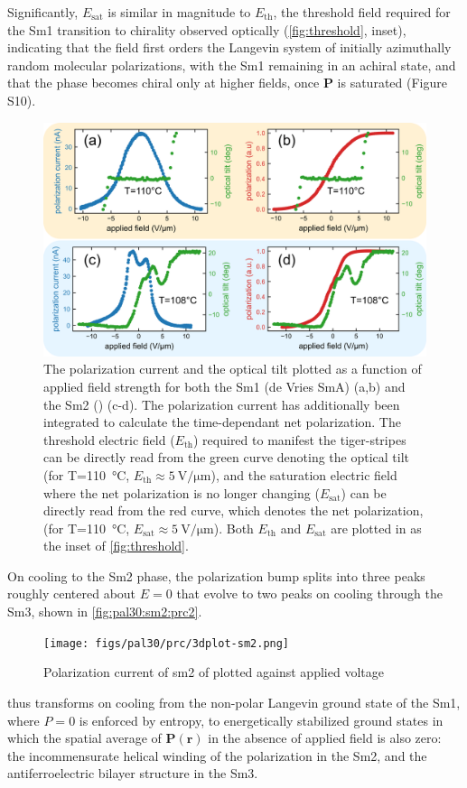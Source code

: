\documentclass[aagreenthesis]{subfiles}
\begin{document}
Significantly, $E_\text{sat}$ is similar in magnitude to $E_\text{th}$, the threshold
field required for the Sm1
transition to chirality observed optically (\autoref{fig:threshold}, inset), indicating that the
field first orders the Langevin system of initially azimuthally random molecular
polarizations, with the Sm1 remaining in an achiral state, and that the phase becomes
chiral only at higher fields, once $\mathbf{P}$ is saturated (Figure S10). 

\begin{figure}[h!]
    \centering
    \includegraphics[width=.6\textwidth]{figs/pal30/prc/PRCvsTilt/PRCVtilt.png}
    \caption{\label{fig:pal30:prcvtilt} The polarization current and the optical
    tilt plotted as a function of applied field strength for both the Sm1
(de Vries SmA) (a,b) and the Sm2 (\smcpalpha{}) (c-d). The polarization current
has additionally been integrated to calculate the time-dependant net
polarization. The threshold electric field ($E_\textrm{th}$) required to manifest the tiger-stripes can
be directly read from the green curve denoting the optical tilt (for
T=\SI{110}{\degreeCelsius}, $E_\textrm{th} \approx \SI{5}{\volt\per\micro\metre}$),
and the saturation electric field where the net polarization is no longer
changing ($E_\textrm{sat}$) can be directly
read from the red curve, which denotes the net polarization, (for
T=\SI{110}{\degreeCelsius}, $E_\textrm{sat} \approx \SI{5}{\volt\per\micro\metre}$).
Both $E_\textrm{th}$ and $E_\textrm{sat}$ are plotted in as the inset of
\autoref{fig:threshold}. }
\end{figure}


On cooling to the Sm2 phase, the polarization bump splits into three peaks roughly centered about
$E=0$ that evolve to two peaks on cooling through the Sm3, shown in
\autoref{fig:pal30:sm2:prc2}.


\begin{figure}[h!]
    \centering
    \texttt{[image: figs/pal30/prc/3dplot-sm2.png]}
    \caption{\label{fig:pal30:sm2:prc2} Polarization current of sm2 of \nfour{}
    plotted against applied voltage}
\end{figure}
 thus transforms on cooling from the non-polar
Langevin ground state of the Sm1, where $P=0$ is enforced by entropy, to energetically stabilized ground
states in which the spatial average of
$\mathbf{P}(\mathbf{r})$ in the absence of applied field is also zero: the incommensurate helical winding of the
polarization
in the Sm2, and the antiferroelectric bilayer structure in the Sm3.
\end{document}
